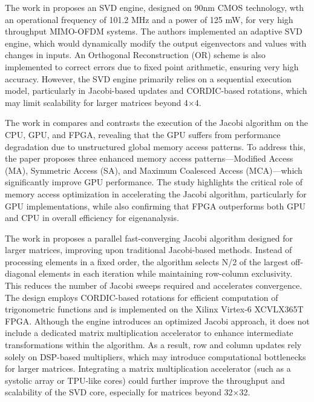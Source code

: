 The work in \cite{svd_architecture-3} proposes an SVD engine, designed on 90nm CMOS technology, wth an operational frequency of 101.2 MHz and a power of 125 mW, for very high throughput MIMO-OFDM systems. The authors implemented an adaptive SVD engine, which would dynamically modify the output eigenvectors and values with changes in inputs. An Orthogonal Reconstruction (OR) scheme is also implemented to correct errors due to fixed point arithmetic, ensuring very high accuracy. However, the SVD engine primarily relies on a sequential execution model, particularly in Jacobi-based updates and CORDIC-based rotations, which may limit scalability for larger matrices beyond 4×4. 

The work in \cite{svd_architecture-4} compares and contrasts the execution of the Jacobi algorithm on the CPU, GPU, and FPGA, revealing that the GPU suffers from performance degradation due to unstructured global memory access patterns. To address this, the paper proposes three enhanced memory access patterns—Modified Access (MA), Symmetric Access (SA), and Maximum Coalesced Access (MCA)—which significantly improve GPU performance. The study highlights the critical role of memory access optimization in accelerating the Jacobi algorithm, particularly for GPU implementations, while also confirming that FPGA outperforms both GPU and CPU in overall efficiency for eigenanalysis. 

The work in \cite{svd_architecture-5} proposes a parallel fast-converging Jacobi algorithm designed for larger matrices, improving upon traditional Jacobi-based methods. Instead of processing elements in a fixed order, the algorithm selects N/2 of the largest off-diagonal elements in each iteration while maintaining row-column exclusivity. This reduces the number of Jacobi sweeps required and accelerates convergence. The design employs CORDIC-based rotations for efficient computation of trigonometric functions and is implemented on the Xilinx Virtex-6 XCVLX365T FPGA. Although the engine introduces an optimized Jacobi approach, it does not include a dedicated matrix multiplication accelerator to enhance intermediate transformations within the algorithm. As a result, row and column updates rely solely on DSP-based multipliers, which may introduce computational bottlenecks for larger matrices. Integrating a matrix multiplication accelerator (such as a systolic array or TPU-like cores) could further improve the throughput and scalability of the SVD core, especially for matrices beyond 32×32. 

